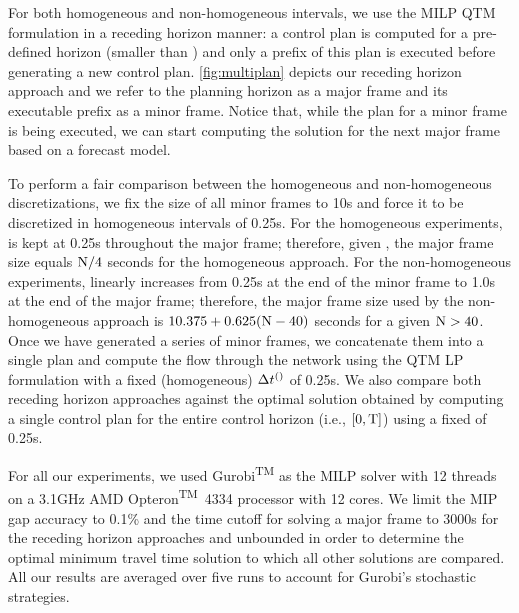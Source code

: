 For both homogeneous and non-homogeneous intervals, we use the MILP QTM
formulation in a receding horizon manner: a control plan is
computed for a pre-defined horizon (smaller than \TMAX) and only a prefix of
this plan is executed before generating a new control plan. 
%
\cref{fig:multiplan} depicts our receding horizon approach and we refer to the
planning horizon as a major frame and its executable prefix as a minor frame.
%
Notice that, while the plan for a minor frame is being executed, we can start
computing the solution for the next major frame based on a forecast model.


To perform a fair comparison between the homogeneous and non-homogeneous
discretizations, we fix the size of all minor frames to 10s and force it to be
discretized in homogeneous intervals of 0.25s.
%
For the homogeneous experiments, \DT[] is kept at 0.25s throughout the major
frame; therefore, given \Nn, the major frame size equals $\Nn/4$ seconds for the
homogeneous approach.
%
For the non-homogeneous experiments, \DT[] linearly increases from
0.25s at the end of the minor frame to 1.0s at the end of the major frame;
therefore, the major frame size used by the non-homogeneous approach
is $10.375 + 0.625(\Nn-40)$ seconds for a given $\Nn > 40$.
%
%
Once we have generated a series of minor frames, we concatenate them into a
single plan and compute the flow through the network using the QTM LP
formulation with a fixed (homogeneous) $\DT[]$ of 0.25s.
%
%
We also compare both receding horizon approaches against the optimal solution
obtained by computing a single control plan for the entire control horizon
(i.e., $[0,\TMAX]$) using a fixed \DT[] of 0.25s.

\newpage
For all our experiments, we used Gurobi\textsuperscript{TM} as the MILP solver with
12 threads on a 3.1GHz AMD Opteron\textsuperscript{TM}~4334 processor with 12
cores.
%
We limit the MIP gap accuracy to 0.1\% and the time cutoff for solving a major
frame to 3000s for the receding horizon approaches and unbounded in order to
determine the optimal minimum travel time solution to which all other solutions are compared.
%
%
All our results are averaged over five runs to account for Gurobi's
stochastic strategies.



